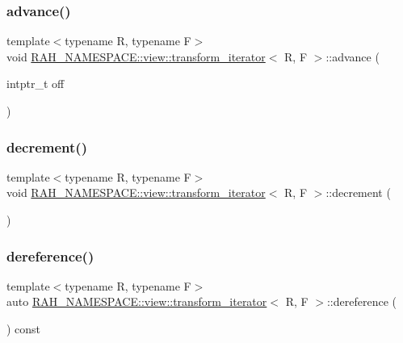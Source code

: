 \subsubsection{\texorpdfstring{advance()}{advance()}}
{\footnotesize\ttfamily template$<$typename R, typename F$>$ \\
void \mbox{\hyperlink{struct_r_a_h___n_a_m_e_s_p_a_c_e_1_1view_1_1transform__iterator}{R\+A\+H\+\_\+\+N\+A\+M\+E\+S\+P\+A\+C\+E\+::view\+::transform\+\_\+iterator}}$<$ R, F $>$\+::advance (\begin{DoxyParamCaption}\item[{intptr\+\_\+t}]{off }\end{DoxyParamCaption})\hspace{0.3cm}{\ttfamily [inline]}}

\mbox{\label{struct_r_a_h___n_a_m_e_s_p_a_c_e_1_1view_1_1transform__iterator_a99b8d1749560539e4b1c2d7cda4074c0}} 
\subsubsection{\texorpdfstring{decrement()}{decrement()}}
{\footnotesize\ttfamily template$<$typename R, typename F$>$ \\
void \mbox{\hyperlink{struct_r_a_h___n_a_m_e_s_p_a_c_e_1_1view_1_1transform__iterator}{R\+A\+H\+\_\+\+N\+A\+M\+E\+S\+P\+A\+C\+E\+::view\+::transform\+\_\+iterator}}$<$ R, F $>$\+::decrement (\begin{DoxyParamCaption}{ }\end{DoxyParamCaption})\hspace{0.3cm}{\ttfamily [inline]}}

\mbox{\label{struct_r_a_h___n_a_m_e_s_p_a_c_e_1_1view_1_1transform__iterator_a74509747cb7b599f23f0d169450b344f}} 
\subsubsection{\texorpdfstring{dereference()}{dereference()}}
{\footnotesize\ttfamily template$<$typename R, typename F$>$ \\
auto \mbox{\hyperlink{struct_r_a_h___n_a_m_e_s_p_a_c_e_1_1view_1_1transform__iterator}{R\+A\+H\+\_\+\+N\+A\+M\+E\+S\+P\+A\+C\+E\+::view\+::transform\+\_\+iterator}}$<$ R, F $>$\+::dereference (\begin{DoxyParamCaption}{ }\end{DoxyParamCaption}) const\hspace{0.3cm}{\ttfamily [inline]}}

